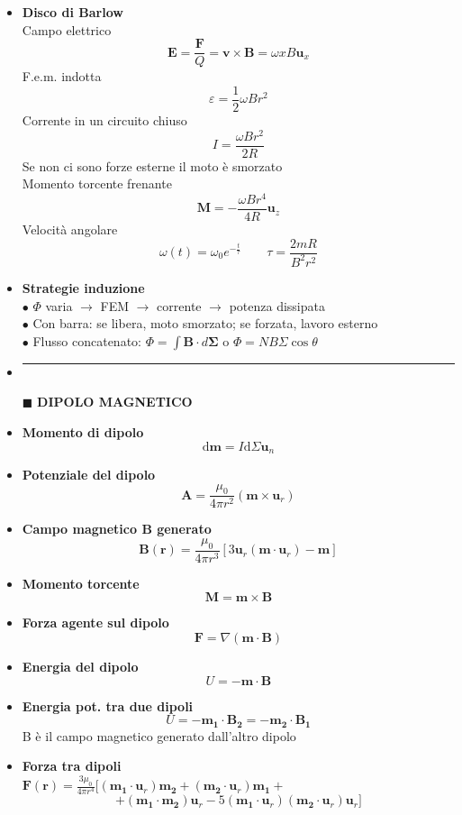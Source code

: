 \documentclass{book}
\newcommand{\g}{\textbf}
\newcommand{\h}{\mathbf}
\newcommand{\e}{\begin{equation}}
\newcommand{\ex}{\end{equation} }
\renewcommand{\it}{\item[$\cdot$]}
\newcommand{\sep}{\item[]\rule{\linewidth}{0.4pt}}
\begin{document}
\begin{multicols}{4}
\begin{itemize}
    \it \g{Disco di Barlow}\\
        Campo elettrico
        \e{\h{E}=\frac{\h{F}}{Q}=\h{v}\times\h{B}=\omega x B \h{u}_x}\ex
        F.e.m. indotta
        \e{\varepsilon=\frac{1}{2}\omega B r^2}\ex
        Corrente in un circuito chiuso
        \e{I=\frac{\omega B r^2}{2R}} \ex
        Se non ci sono forze esterne il moto è smorzato \\
        Momento torcente frenante
        \e{\h{M}=-\frac{\omega B r^4}{4 R}\h{u}_z}\ex
        Velocità angolare
        \e{\omega(t)=\omega_0e^{-\frac{t}{\tau}} \qquad \tau=\frac{2mR}{B^2r^2}}\ex
    \it \g{Strategie induzione} \\
        $\bullet$ $\Phi$ varia $\to$ FEM $\to$ corrente $\to$ potenza dissipata \\
        $\bullet$ Con barra: se libera, moto smorzato; se forzata, lavoro esterno \\
        $\bullet$ Flusso concatenato: $\Phi=\int\h{B}\cdot d\h{\Sigma}$ o $\Phi=NB\Sigma\cos\theta$ \\

\sep
\item [$\blacksquare$] \g{DIPOLO MAGNETICO}
    \it \g{Momento di dipolo}
        \e{\mathrm{d}\h{m}=I\mathrm{d}\Sigma\h{u}_n} \ex
    \it \g{Potenziale del dipolo}
        \e{\h{A}=\frac{\mu_0}{4\pi r^2}(\h{m}\times\h{u}_r)}\ex
    \it \g{Campo magnetico B generato}
        \e{\h{B}(\h{r})=\frac{\mu_0}{4\pi r^3}[3\h{u}_r(\h{m}\cdot\h{u}_r)-\h{m}]}\ex
    \it \g{Momento torcente}
        \e{\h{M}=\h{m}\times\h{B}} \ex
    \it \g{Forza agente sul dipolo}
        \e{\h{F}=\nabla(\h{m}\cdot\h{B})} \ex
    \it \g{Energia del dipolo}
        \e{U=-\h{m}\cdot\h{B}} \ex
    \it \g{Energia pot. tra due dipoli}
        \e{U=-\h{m_1}\cdot\h{B_2}=-\h{m_2}\cdot\h{B_1}} \ex
        B è il campo magnetico generato dall'altro dipolo 
    \it \g{Forza tra dipoli} \\
        $\h{F}(\h{r})=\frac{3\mu_0}{4\pi r^4}[(\h{m_1}\cdot\h{u}_r)\h{m_2}+(\h{m_2}\cdot\h{u}_r)\h{m_1}+$
        \e{+(\h{m_1}\cdot\h{m_2})\h{u}_r-5(\h{m_1}\cdot\h{u}_r)(\h{m_2}\cdot\h{u}_r)\h{u}_r]}\ex


\end{itemize}
\end{multicols}
\end{document}
